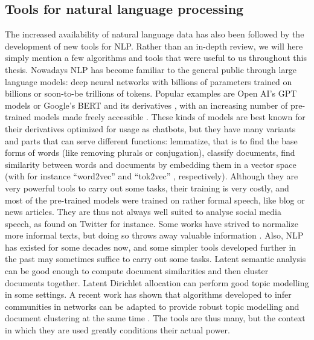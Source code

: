 \documentclass[../thesis.tex]{subfiles}
\begin{document}
\subsection{Tools for natural language processing}
The increased availability of natural language data has also been followed by the
development of new tools for \ac{NLP}. Rather than an in-depth review, we will here
simply mention a few algorithms and tools that were useful to us throughout this thesis.
Nowadays \ac{NLP} has become familiar to the general public through large language
models: deep neural networks with billions of parameters trained on billions or
soon-to-be trillions of tokens. Popular examples are Open AI's GPT models
\cite{BrownLanguageModels2020} or Google's BERT \cite{DevlinBERTPretraining2019} and its
derivatives \cite{SanhDistilBERTDistilled2020}, with an increasing number of pre-trained
models made freely accessible
\cite{WolfTransformersStateoftheArt2020,MontaniExplosionSpaCy2023}. These kinds of
models are best known for their derivatives optimized for usage as chatbots, but they
have many variants and parts that can serve different functions: lemmatize, that is
to find the base forms of words (like removing plurals or conjugation), classify
documents, find similarity between words and documents by embedding them in a vector
space (with for instance ``word2vec'' \cite{MikolovEfficientEstimation2013} and
``tok2vec'' \cite{AngelovTop2VecDistributed2020}, respectively). Although they are very
powerful tools to carry out some tasks, their training is very costly, and most of the
pre-trained models were trained on rather formal speech, like blog or news articles.
They are thus not always well suited to analyse social media speech, as found on Twitter
for instance. Some works have strived to normalize more informal texts, but doing so
throws away valuable information \cite{EisensteinWhatBad2013}. Also, \ac{NLP} has
existed for some decades now, and some simpler tools developed further in the past may
sometimes suffice to carry out some tasks. Latent semantic analysis
\cite{DumaisLatentSemantic2004} can be good enough to compute document similarities and
then cluster documents together. Latent Dirichlet allocation
\cite{BleiLatentDirichlet2003} can perform good topic modelling in some settings. A
recent work has shown that algorithms developed to infer communities in networks can be
adapted to provide robust topic modelling and document clustering at the same time
\cite{GerlachNetworkApproach2018}. The tools are thus many, but the context in which
they are used greatly conditions their actual power.
\end{document}
